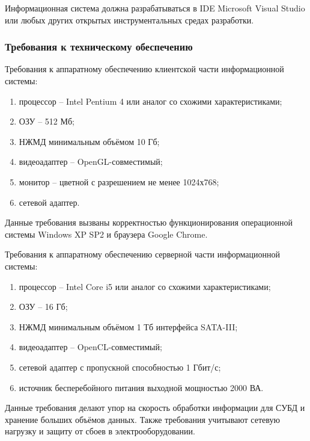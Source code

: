 Информационная система должна разрабатываться в IDE Microsoft Visual Studio или любых других открытых инструментальных средах разработки.

\subsubsection{Требования к техническому обеспечению}

Требования к аппаратному обеспечению клиентской части информационной системы:
\begin{enumerate}
	\item процессор -- Intel Pentium 4 или аналог со схожими характеристиками;
	\item ОЗУ -- 512 Мб;
	\item НЖМД минимальным объёмом 10 Гб;
	\item видеоадаптер -- OpenGL-совместимый;
	\item монитор -- цветной с разрешением не менее 1024х768;
	\item сетевой адаптер.
\end{enumerate}

Данные требования вызваны корректностью функционирования операционной системы Windows XP SP2 и браузера Google Chrome.

Требования к аппаратному обеспечению серверной части информационной системы:
\begin{enumerate}
	\item процессор -- Intel Core i5 или аналог со схожими характеристиками;
	\item ОЗУ -- 16 Гб;
	\item НЖМД минимальным объёмом 1 Тб интерфейса SATA-III;
	\item видеоадаптер -- OpenCL-совместимый;
	\item сетевой адаптер с пропускной способностью 1 Гбит/с;
	\item источник бесперебойного питания выходной мощностью 2000 ВА.
\end{enumerate}

Данные требования делают упор на скорость обработки информации для СУБД и хранение больших объёмов данных.
Также требования учитывают сетевую нагрузку и защиту от сбоев в электрооборудовании.

\clearpage
\newpage